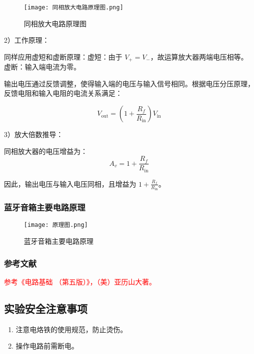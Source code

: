 \documentclass[dvipsnames, svgnames,a4paper,11pt]{article}
\begin{document}
	\begin{figure}[htbp]
		\centering
		\texttt{[image: 同相放大电路原理图.png]}
		\caption{同相放大电路原理图}
		\label{fig:同相放大电路原理图}
	\end{figure}

		2）工作原理：

		同样应用虚短和虚断原理：虚短：由于 \( V_+ = V_- \)，故运算放大器两端电压相等。虚断：输入端电流为零。

		输出电压通过反馈调整，使得输入端的电压与输入信号相同。根据电压分压原理，反馈电阻和输入电阻的电流关系满足：

		\begin{equation}
			V_{\text{out}} = \left( 1 + \frac{R_f}{R_{\text{in}}} \right) V_{\text{in}}
			\label{eq:5}
		\end{equation}

		3）放大倍数推导：

		同相放大器的电压增益为：
		\begin{equation}
			A_v = 1 + \frac{R_f}{R_{\text{in}}}
			\label{eq:6}
		\end{equation}

因此，输出电压与输入电压同相，且增益为 \( 1 + \frac{R_f}{R_{\text{in}}} \)。

\clearpage
	\subsubsection{蓝牙音箱主要电路原理}
	\begin{figure}[htbp]
		\centering
		\texttt{[image: 原理图.png]}
		\caption{蓝牙音箱主要电路原理}
		\label{fig:蓝牙音箱主要电路原理}
	\end{figure}




	\subsubsection{参考文献}
	\textcolor{red}{参考《电路基础 （第五版）》，（美）亚历山大著。}


\subsection{实验安全注意事项}
\begin{enumerate}
	\item 注意电烙铁的使用规范，防止烫伤。
	\item 操作电路前需断电。
\end{enumerate}
\clearpage
\end{document}
